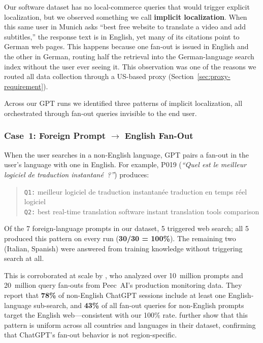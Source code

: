 Our software dataset has no local-commerce queries that would trigger explicit localization, but we observed something we call \textbf{implicit localization}. When this same user in Munich asks ``best free website to translate a video and add subtitles,'' the response text is in English, yet many of its citations point to German web pages. This happens because one fan-out is issued in English and the other in German, routing half the retrieval into the 
German-language search index without the user ever seeing it. This observation was one of the reasons we routed all data collection through a US-based proxy (Section~\ref{sec:proxy-requirement}).

Across our GPT runs we identified three patterns of implicit localization, all orchestrated through fan-out queries invisible to the end user.

\subsubsection{Case~1: Foreign Prompt $\rightarrow$ English Fan-Out}

When the user searches in a non-English language, GPT pairs a fan-out in the user's language with one in English. For example, P019 (\emph{``Quel est le meilleur logiciel de traduction instantan\'{e}~?''}) produces:

\begin{quote}
\small
\texttt{Q1:} meilleur logiciel de traduction instantan\'{e}e traduction en temps r\'{e}el logiciel\\
\texttt{Q2:} best real-time translation software instant translation tools comparison
\end{quote}

\noindent Of the 7 foreign-language prompts in our dataset, 5 triggered web search; all 5 produced this pattern on every run (\textbf{30/30 = 100\%}). The remaining two (Italian, Spanish) were answered from training knowledge without triggering search at all.

This is corroborated at scale by \textcite{rudzki2026english}, who analyzed over 10~million prompts and 20~million query fan-outs from Peec~AI's production monitoring data. They report that \textbf{78\%} of non-English ChatGPT sessions include at least one English-language sub-search, and \textbf{43\%} of all fan-out queries for non-English prompts target the English web---consistent with our 100\% rate. \textcite{rudzki2026country} further show that this pattern is uniform across all countries and languages in their dataset, confirming that ChatGPT's fan-out behavior is not region-specific.

